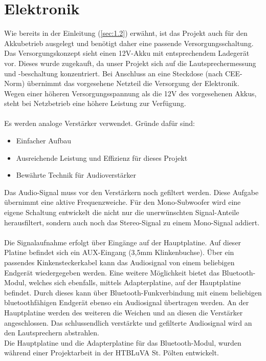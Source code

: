 \section{Elektronik}\label{subsec:2.1.1}
Wie bereits in der Einleitung (\ref{sec:1.2}) erwähnt, ist das Projekt auch für den Akkubetrieb ausgelegt und benötigt daher eine passende Versorgungsschaltung.
Das Versorgungskonzept sieht einen 12V-Akku mit entsprechendem Ladegerät vor.
Dieses wurde zugekauft, da unser Projekt sich auf die Lautsprechermessung und -beschaltung konzentriert.
Bei Anschluss an eine Steckdose (nach CEE-Norm) übernimmt das vorgesehene Netzteil die Versorgung der Elektronik.
Wegen einer höheren Versorgungsspannung als die 12V des vorgesehenen Akkus, steht bei Netzbetrieb eine höhere Leistung zur Verfügung. \\ \\
Es werden analoge Verstärker verwendet.
Gründe dafür sind:
\begin{itemize}
	\item Einfacher Aufbau
	\item Ausreichende Leistung und Effizienz für dieses Projekt
	\item Bewährte Technik für Audioverstärker
\end{itemize} 
Das Audio-Signal muss vor den Verstärkern noch gefiltert werden.
Diese Aufgabe übernimmt eine aktive Frequenzweiche.
Für den Mono-Subwoofer wird eine eigene Schaltung entwickelt die nicht nur die unerwünschten Signal-Anteile herausfiltert, sondern auch noch das Stereo-Signal zu einem Mono-Signal addiert.\\ \\
Die Signalaufnahme erfolgt über Eingänge auf der Hauptplatine.
Auf dieser Platine befindet sich ein AUX-Eingang (3,5mm Klinkenbuchse).
Über ein passendes Kinkensteckerkabel kann das Audiosignal von einem beliebigen Endgerät wiedergegeben werden.
Eine weitere Möglichkeit bietet das Bluetooth-Modul, welches sich ebenfalls, mittels Adapterplatine, auf der Hauptplatine befindet.
Durch dieses kann über Bluetooth-Funkverbindung mit einem beliebigen bluetoothfähigen Endgerät ebenso ein Audiosignal übertragen werden.
An der Hauptplatine werden des weiteren die Weichen und an diesen die Verstärker angeschlossen. 
Das schlussendlich verstärkte und gefilterte Audiosignal wird an den Lautsprechern abstrahlen.\\
Die Hauptplatine und die Adapterplatine für das Bluetooth-Modul, wurden während einer Projektarbeit in der HTBLuVA St. Pölten entwickelt.

